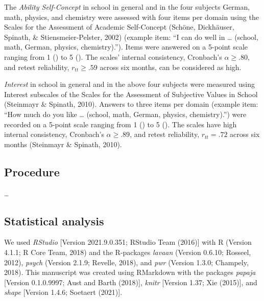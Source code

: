 \documentclass[
  man]{apa6}
\begin{document}
The \emph{Ability Self-Concept} in school in general and in the four subjects German, math, physics, and chemistry were assessed with four items per domain using the Scales for the Assessment of Academic Self-Concept (Schöne, Dickhäuser, Spinath, \& Stiensmeier-Pelster, 2002) (example item: ``I can do well in \ldots{} (school, math, German, physics, chemistry).''). Items were answered on a 5-point scale ranging from 1 () to 5 (). The scales' internal consistency, Cronbach's \(\alpha\ge.80\), and retest reliability, \(r_{tt}\ge.59\) across six months, can be considered as high.

\emph{Interest} in school in general and in the above four subjects were measured using Interest subscales of the Scales for the Assessment of Subjective Values in School (Steinmayr \& Spinath, 2010). Answers to three items per domain (example item: ``How much do you like \ldots{} (school, math, German, physics, chemistry).'') were recorded on a 5-point scale ranging from 1 () to 5 (). The scales have high internal consistency, Cronbach's \(\alpha\ge.89\), and retest reliability, \(r_{tt} = .72\) across six months (Steinmayr \& Spinath, 2010).

\hypertarget{procedure}{%
\subsection{Procedure}\label{procedure}}

\ldots{}

\hypertarget{statistical-analysis}{%
\subsection{Statistical analysis}\label{statistical-analysis}}

We used \emph{RStudio} {[}Version 2021.9.0.351; RStudio Team (2016){]} with R (Version 4.1.1; R Core Team, 2018) and the R-packages \emph{lavaan} (Version 0.6.10; Rosseel, 2012), \emph{psych} (Version 2.1.9; Revelle, 2018), and \emph{pwr} (Version 1.3.0; Champely, 2018). This manuscript was created using RMarkdown with the packages \emph{papaja} {[}Version 0.1.0.9997; Aust and Barth (2018){]}, \emph{knitr} {[}Version 1.37; Xie (2015){]}, and \emph{shape} {[}Version 1.4.6; Soetaert (2021){]}.
\end{document}
